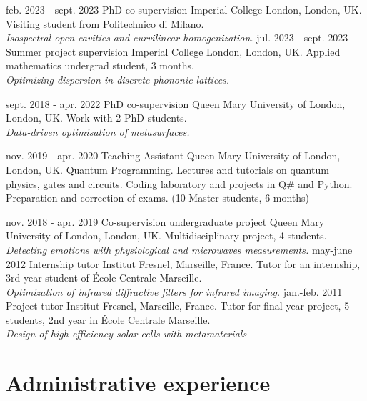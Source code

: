 \documentclass{cv}
\begin{document}
\begin{entrylist}

	\entry
	{feb. 2023 - sept. 2023}
	{PhD co-supervision}
	{Imperial College London, London, UK.}
	{Visiting student from  Politechnico di Milano.\\
		\emph{Isospectral open cavities and curvilinear homogenization.}}
	\entry
	{jul. 2023 - sept. 2023}
	{Summer project supervision}
	{Imperial College London, London, UK.}
	{Applied mathematics undergrad student, 3 months.\\
		\emph{Optimizing dispersion in discrete phononic lattices.}}

	\entry
	{sept. 2018 - apr. 2022}
	{PhD co-supervision}
	{Queen Mary University of London, London, UK.}
	{Work with 2 PhD students.\\
		\emph{Data-driven optimisation of metasurfaces.}}

	\entry
	{nov. 2019 - apr. 2020}
	{Teaching Assistant}
	{Queen Mary University of London, London, UK.}
	{Quantum Programming. Lectures and tutorials on quantum physics, gates and circuits.
		Coding laboratory and projects in Q\# and Python. Preparation and correction of exams. (10 Master students, 6 months) }


	\entry
	{nov. 2018 - apr. 2019}
	{Co-supervision undergraduate project}
	{Queen Mary University of London, London, UK.}
	{Multidisciplinary project, 4 students.\\
		\emph{Detecting emotions with physiological and microwaves measurements.}}
	\entry
	{may-june 2012}
	{Internship tutor}
	{Institut Fresnel, Marseille, France.}
	{Tutor for an internship, 3rd year student of École Centrale Marseille.\\
		\emph{Optimization of infrared diffractive filters for infrared imaging.}}
	\entry
	{jan.-feb. 2011}
	{Project tutor}
	{Institut Fresnel, Marseille, France.}
	{Tutor for final year project, 5 students, 2nd year in École Centrale Marseille.\\
		\emph{Design of high efficiency solar cells with metamaterials}}

\end{entrylist}


\section{Administrative experience}
\end{document}
